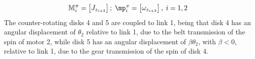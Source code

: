 \documentclass[a4paper,11pt,brazil,fleqn]{article}
\begin{document}
\begin{equation}\label{eq:DiscsModel3}
\mM\ssh_i = \begin{bmatrix} J_{z_{i+3}} \end{bmatrix}; \; \mp\ssh_i = \begin{bmatrix} \omega_{z_{i+3}} \end{bmatrix}, \; i = 1, 2
\end{equation}
The counter-rotating disks 4 and 5 are coupled to link 1, being that disk 4 has an angular displacement of $\theta_2$ relative to link 1, due to the belt transmission of the spin of motor 2, while disk 5 has an angular displacement of $\beta\theta_2$, with $\beta < 0$, relative to link 1, due to the gear transmission of the spin of disk 4.
\end{document}
